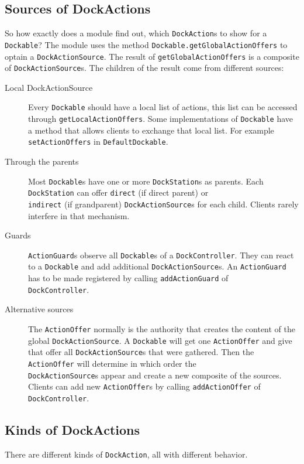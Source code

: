 \documentclass[a4paper,10pt]{article}
\newcommand{\src}[1]{\lstinline[basicstyle=\normalsize\ttfamily,keywordstyle=\normalsize\ttfamily,identifierstyle=\normalsize\ttfamily]|#1|}
\begin{document}
\subsection{Sources of DockActions}
So how exactly does a module find out, which \src{DockAction}s to show for a \src{Dockable}? The module uses the method \src{Dockable.getGlobalActionOffers} to optain a \src{DockActionSource}. The result of \src{getGlobalActionOffers} is a composite of \src{DockActionSource}s. The children of the result come from different sources:
\begin{description}
 \item[Local DockActionSource] Every \src{Dockable} should have a local list of actions, this list can be accessed through \src{getLocalActionOffers}. Some implementations of \src{Dockable} have a method that allows clients to exchange that local list. For example \src{setActionOffers} in \src{DefaultDockable}.
 \item[Through the parents] Most \src{Dockable}s have one or more \src{DockStation}s as parents. Each \src{DockStation} can offer \src{direct} (if direct parent) or \\\src{indirect} (if grandparent) \src{DockActionSource}s for each child. Clients rarely interfere in that mechanism.
 \item[Guards] \src{ActionGuard}s observe all \src{Dockable}s of a \src{DockController}. They can react to a \src{Dockable} and add additional \src{DockActionSource}s. An \src{ActionGuard} has to be made registered by calling \src{addActionGuard} of \\\src{DockController}.
 \item[Alternative sources] The \src{ActionOffer} normally is the authority that creates the content of the global \src{DockActionSource}. A \src{Dockable} will get one \src{ActionOffer} and give that offer all \src{DockActionSource}s that were gathered. Then the \src{ActionOffer} will determine in which order the \\\src{DockActionSource}s appear and create a new composite of the sources. Clients can add new \src{ActionOffer}s by calling \src{addActionOffer} of \\\src{DockController}.
 \end{description}

\subsection{Kinds of DockActions}
There are different kinds of \src{DockAction}, all with different behavior. 
\end{document}
